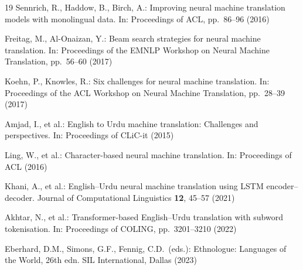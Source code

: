 \documentclass[runningheads]{llncs}
\begin{document}
\begin{thebibliography}{19}
Sennrich, R., Haddow, B., Birch, A.:
Improving neural machine translation models with monolingual data.
In: Proceedings of ACL, pp.~86--96 (2016)

Freitag, M., Al-Onaizan, Y.:
Beam search strategies for neural machine translation.
In: Proceedings of the EMNLP Workshop on Neural Machine Translation,
pp.~56--60 (2017)

Koehn, P., Knowles, R.:
Six challenges for neural machine translation.
In: Proceedings of the ACL Workshop on Neural Machine Translation,
pp.~28--39 (2017)

Amjad, I., et al.:
English to Urdu machine translation: Challenges and perspectives.
In: Proceedings of CLiC-it (2015)

Ling, W., et al.:
Character-based neural machine translation.
In: Proceedings of ACL (2016)

Khani, A., et al.:
English--Urdu neural machine translation using LSTM encoder--decoder.
Journal of Computational Linguistics \textbf{12}, 45--57 (2021)

Akhtar, N., et al.:
Transformer-based English--Urdu translation with subword tokenisation.
In: Proceedings of COLING, pp.~3201--3210 (2022)

Eberhard, D.M., Simons, G.F., Fennig, C.D.\ (eds.):
Ethnologue: Languages of the World, 26th edn.
SIL International, Dallas (2023)

\end{thebibliography}
\end{document}
